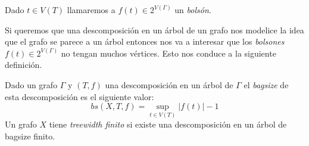 \documentclass[tesis.tex]{subfiles}
\begin{document}
Dado $t \in V(T)$ llamaremos a $f(t) \in 2^{V(\Gamma)}$ un \emph{bolsón}.
\smallskip

Si queremos que una descomposición en un árbol de un grafo nos modelice la idea que el grafo se parece a un árbol entonces nos va a interesar que los \emph{bolsones} $f(t) \in 2^{V(\Gamma)}$ no tengan muchos vértices. 
Esto nos conduce a la siguiente definición.



\begin{deff}
	Dado un grafo $\Gamma$ y $(T,f)$ una descomposición en un árbol de $\Gamma$ el \emph{bagsize} de esta descomposición es el siguiente valor:
	\begin{equation*}
		bs(X,T,f) = \sup_{t \in V(T)} |f(t)| - 1
	\end{equation*}
	Un grafo $X$ tiene \emph{treewidth finito} si existe una descomposición en un árbol de bagsize finito.	
\end{deff}
\end{document}
